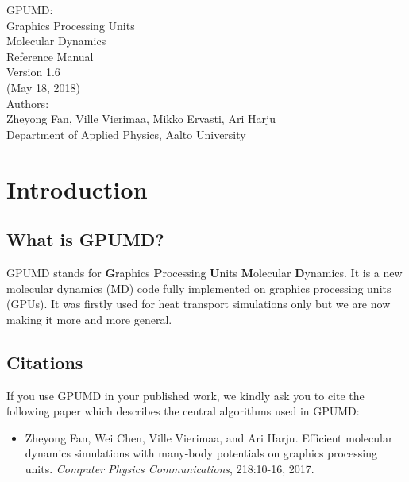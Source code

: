 \documentclass[12pt,a4paper]{report}
\begin{document}
\begin{center}
  \huge
  {
   \vspace*{1.0cm}
   GPUMD: \\
   Graphics Processing Units \\
   Molecular Dynamics\\
   \vspace*{1.0cm}
   Reference Manual\\
   \vspace*{1.0cm}
   Version 1.6\\
   \vspace*{1.0cm}
   (May 18, 2018)\\
  \vspace*{2.0cm}
  }
  \large
  {
  Authors: \\
  Zheyong Fan,
  Ville Vierimaa,
  Mikko Ervasti,
  Ari Harju \\
  Department of Applied Physics, Aalto University
  }
  \vspace*{1.0cm}
\end{center}


\tableofcontents


\chapter{Introduction}


\section{What is GPUMD?}

GPUMD stands for \textbf{G}raphics \textbf{P}rocessing \textbf{U}nits \textbf{M}olecular \textbf{D}ynamics. It is a new molecular dynamics (MD) code fully implemented on graphics processing units (GPUs). It was firstly used for heat transport simulations only but we are now making it more and more general.


\section{Citations}

If you use GPUMD in your published work, we kindly ask you to cite the following paper which describes the central algorithms used in GPUMD:

\begin{itemize}
\item Zheyong Fan, Wei Chen, Ville Vierimaa, and Ari Harju. Efficient molecular
dynamics simulations with many-body potentials on graphics processing units.
\textit{Computer Physics Communications}, 218:10-16, 2017.
\end{itemize}
\end{document}
